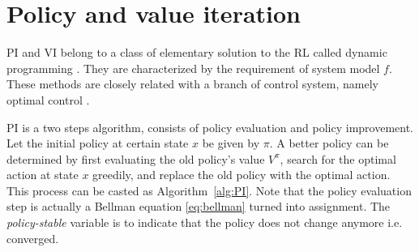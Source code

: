 \section{Policy and value iteration} \label{sec:value_iter}
\ac {PI} and \ac{VI} belong to a class of elementary solution to the \acs{RL} called  dynamic programming \cite{sutton1998reinforcement}. They are characterized by the requirement of system model $f$. These methods are closely related with a branch of control system, namely optimal control \cite{126844}.

\acs {PI} is a two steps algorithm, consists of policy evaluation and policy improvement. Let the initial policy at certain state $x$ be given by $ \pi$. A better policy can be determined by first evaluating the old policy's value $ V^{\pi} $, search for the optimal action at state $x$ greedily, and replace the old policy with the optimal action. This process can be casted as Algorithm~\ref{alg:PI}. Note that the policy evaluation step is actually a Bellman equation \eqref{eq:bellman} turned into assignment. The \textit{policy-stable} variable is to indicate that the policy does not change anymore i.e. converged.

